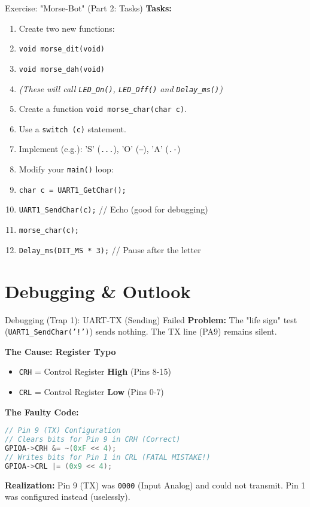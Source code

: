 \documentclass{beamer}
\begin{document}
\begin{frame}[fragile]{Exercise: "Morse-Bot" (Part 2: Tasks)}
	\textbf{Tasks:}
	\begin{enumerate}
		\item Create two new functions:
		\item \texttt{void morse\_dit(void)}
		\item \texttt{void morse\_dah(void)}
		\item \textit{(These will call \texttt{LED\_On()}, \texttt{LED\_Off()} and \texttt{Delay\_ms()})}
		
		\medskip
		\item Create a function \texttt{void morse\_char(char c)}.
		\item Use a \texttt{switch (c)} statement.
		\item Implement (e.g.): 'S' (\texttt{...}), 'O' (\texttt{---}), 'A' (\texttt{.-})
		
		\medskip
		\item Modify your \texttt{main()} loop:
		\item \texttt{char c = UART1\_GetChar();}
		\item \texttt{UART1\_SendChar(c);} // Echo (good for debugging)
		\item \texttt{morse\_char(c);}
		\item \texttt{Delay\_ms(DIT\_MS * 3);} // Pause after the letter
	\end{enumerate}
\end{frame}

\section{Debugging \& Outlook}

\begin{frame}[fragile]{Debugging (Trap 1): UART-TX (Sending) Failed}
	\textbf{Problem:} The "life sign" test (\texttt{UART1\_SendChar('!')}) sends nothing. The TX line (PA9) remains silent.
	
	\bigskip
	\textbf{The Cause: Register Typo}
	\begin{itemize}
		\item \texttt{CRH} = Control Register \textbf{High} (Pins 8-15)
		\item \texttt{CRL} = Control Register \textbf{Low} (Pins 0-7)
	\end{itemize}
	
	\bigskip
	\textbf{The Faulty Code:}
	\begin{lstlisting}[language=C, style=mystyle]
// Pin 9 (TX) Configuration
// Clears bits for Pin 9 in CRH (Correct)
GPIOA->CRH &= ~(0xF << 4); 
// Writes bits for Pin 1 in CRL (FATAL MISTAKE!)
GPIOA->CRL |= (0x9 << 4); 
	\end{lstlisting}
	
	\medskip
	\textbf{Realization:} Pin 9 (TX) was \texttt{0000} (Input Analog) and could not transmit. Pin 1 was configured instead (uselessly).
\end{frame}
\end{document}
